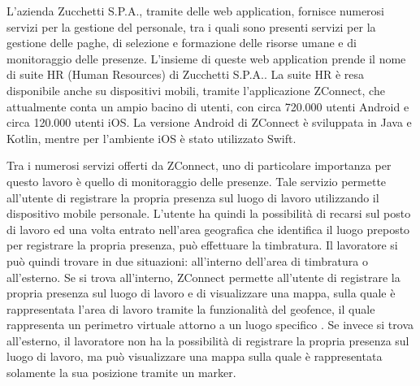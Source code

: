 L'azienda Zucchetti S.P.A., tramite delle web application, fornisce numerosi servizi per la gestione del personale, tra i quali sono presenti servizi per la gestione delle paghe, di selezione e formazione delle risorse umane e di monitoraggio delle presenze. L'insieme di queste web application prende il nome di suite HR (Human Resources) di Zucchetti S.P.A.. La suite HR è resa disponibile anche su dispositivi mobili, tramite l'applicazione ZConnect, che attualmente conta un ampio bacino di utenti, con circa 720.000 utenti Android e circa 120.000 utenti iOS. La versione Android di ZConnect è sviluppata in Java e Kotlin, mentre per l'ambiente iOS è stato utilizzato Swift.

Tra i numerosi servizi offerti da ZConnect, uno di particolare importanza per questo lavoro è quello di monitoraggio delle presenze. Tale servizio permette all'utente di registrare la propria presenza sul luogo di lavoro utilizzando il dispositivo mobile personale. L'utente ha quindi la possibilità di recarsi sul posto di lavoro ed una volta entrato nell'area geografica che identifica il luogo preposto per registrare la propria presenza, può effettuare la timbratura.
Il lavoratore si può quindi trovare in due situazioni: all'interno dell'area di timbratura o all'esterno. Se si trova all'interno, ZConnect permette all'utente di registrare la propria presenza sul luogo di lavoro e di visualizzare una mappa, sulla quale è rappresentata l'area di lavoro tramite la funzionalità del geofence, il quale rappresenta un perimetro virtuale attorno a un luogo specifico \cite{GeoFence}. Se invece si trova all'esterno, il lavoratore non ha la possibilità di registrare la propria presenza sul luogo di lavoro, ma può visualizzare una mappa sulla quale è rappresentata solamente la sua posizione tramite un marker.

